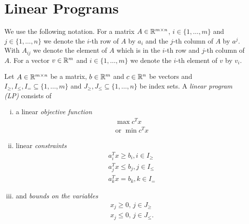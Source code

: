 \section{Linear Programs}
\label{sec:linear-programming}
We use the following notation. For a matrix $A \in \mathbb{R}^{m\times n}$, $i\in
\{1,\ldots,m\}$ and $ j \in \{ 1,\ldots,n\}$ we denote 
the  $i$-th row of  $A$ by  $a_i$ and the $j$-th column of $A$ by
$a^j$. With  $A_{ij}$ we denote the element of $A$ which is in the $i$-th
row and $j$-th column of $A$. For a vector $v \in \mathbb{R}^m$ and $i\in
\{1,\ldots,m\}$ we denote the $i$-th element of $v$ by $v_i$. 



\begin{definition}
\label{def:9}
Let  $A \in \mathbb{R}^{m\times n}$ be a matrix,  $b \in \mathbb{R}^{m}$ and $c \in \mathbb{R}^n$ be
vectors and  $I_\geq,I_\leq,I_= \subseteq \{1,\ldots,m\}$
and $J_\geq,J_\leq \subseteq\{1,\ldots,n\}$ be index sets. A \emph{linear program (LP)}
consists of 
\begin{enumerate}[i)]
\item a linear \emph{objective function}
  \begin{displaymath}
    \begin{array}{c}
      \max c^T x \\
      \text{or } \min c^Tx
    \end{array}
  \end{displaymath}
\item linear \emph{constraints} 
  \begin{displaymath}
    \begin{array}{c}
      a_i^T x \geq b_i, i \in {I_\geq} \\ 
      a_j^T x \leq b_j, j \in {I_\leq} \\ 
      a_k^T x = b_k, k \in {I_=} 
    \end{array}
  \end{displaymath}
\item and  \emph{bounds on the variables} 
  \begin{displaymath}
    \begin{array}{c}
      x_j \geq0, \, j \in J_\geq \\
      x_j \leq0, \, j \in J_\leq. 
    \end{array}
  \end{displaymath}
\end{enumerate}

\end{definition}





